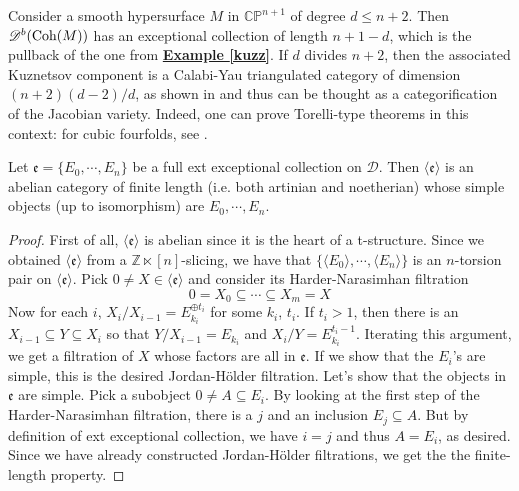 \begin{exmp}
Consider a smooth hypersurface $M$ in $\mathbb{CP}^{n+1}$ of degree $d \le n+2$. Then $\mathscr{D}^b(\textnormal{Coh}(M))$ has an exceptional collection of length $n+1-d$, which is the pullback of the one from \hyperref[kuzz]{\textbf{Example \ref*{kuzz}}}. If $d$ divides $n+2$, then the associated Kuznetsov component is a Calabi-Yau triangulated category of dimension $(n+2)(d-2)/d$, as shown in \cite{kuzz} and thus can be thought as a categorification of the Jacobian variety. Indeed, one can prove Torelli-type theorems in this context: for cubic fourfolds, see \cite{macc}. 
\end{exmp}

\begin{prop}\label{mom}
Let $\mathfrak{e}=\{ E_0, \cdots , E_n \}$ be a full ext exceptional collection on $\mathscr{D}$. Then $\langle \mathfrak{e} \rangle$ is an abelian category of finite length (i.e. both artinian and noetherian) whose simple objects (up to isomorphism) are $E_0, \cdots , E_n$. \\
\end{prop}

\begin{proof}
First of all, $\langle \mathfrak{e} \rangle$ is abelian since it is the heart of a t-structure. Since we obtained $\langle \mathfrak{e} \rangle$ from a $\mathbb{Z} \ltimes [n]$-slicing, we have that $\{ \langle E_0 \rangle , \cdots , \langle E_n \rangle \}$ is an $n$-torsion pair on $\langle \mathfrak{e} \rangle$. Pick $0 \not = X \in \langle \mathfrak{e} \rangle$ and consider its Harder-Narasimhan filtration $$0=X_0 \subseteq \cdots \subseteq X_m=X$$ 
Now for each $i$, $X_i / X_{i-1} = E_{k_i}^{\oplus t_i}$ for some $k_i$, $t_i$. If $t_i > 1$, then there is an $X_{i-1} \subseteq Y \subseteq X_i$ so that $Y / X_{i-1}=E_{k_i}$ and $X_i / Y = E_{k_i}^{t_i-1}$. Iterating this argument, we get a filtration of $X$ whose factors are all in $\mathfrak{e}$. If we show that the $E_i$'s are simple, this is the desired Jordan-H{\"o}lder filtration. Let's show that the objects in $\mathfrak{e}$ are simple. Pick a subobject $0 \not = A \subseteq E_i$. By looking at the first step of the Harder-Narasimhan filtration, there is a $j$ and an inclusion $E_j \subseteq A$. But by definition of ext exceptional collection, we have $i=j$ and thus $A=E_i$, as desired. Since we have already constructed Jordan-H{\"o}lder filtrations, we get the the finite-length property. 
\end{proof}

